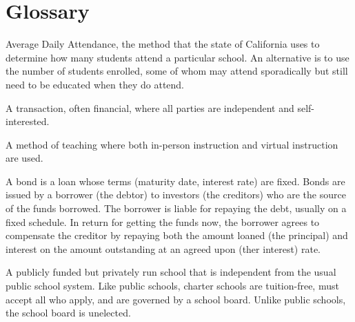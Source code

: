 
\chapter{Glossary}\label{ch:glossary}


\begin{description}[nosep]\DoubleSpacing%


\medskip\item[ADA] Average Daily Attendance, the method that the state of California uses to determine how many students attend a particular school. An alternative is to use the number of students enrolled, some of whom may attend sporadically but still need to be educated when they do attend. \parencite{SACS2019}

\medskip\item[arm's length transaction] A transaction, often financial, where all parties are independent and self-interested. \parencite{Wex2024}

\medskip\item[blended learning] A method of teaching where both in-person instruction and virtual instruction are used. \parencite{Graham2018}

\medskip\item[bond] A bond is a loan whose terms (maturity date, interest rate) are fixed. Bonds are issued by a borrower (the debtor) to investors (the creditors) who are the source of the funds borrowed. The borrower is liable for repaying the debt,  usually on a fixed schedule. In return for getting the funds now, the borrower agrees to compensate the creditor by repaying both the amount loaned (the principal) and interest on the amount outstanding at an agreed upon (ther interest) rate. \parencite{Borad2015}

\medskip\item[charter school] A publicly funded but privately run school that is independent from the usual public school system. Like public schools, charter schools are tuition-free, must accept all who apply, and are governed by a school board. Unlike public schools, the school board is unelected. \parencite{CDE2023, CSBA2016, Eckes2024}


\end{description}
